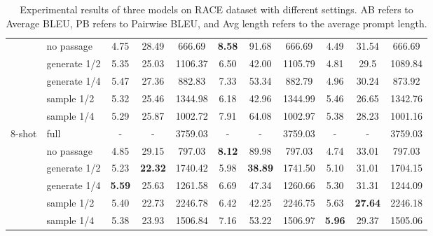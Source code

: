 \begin{table*}[t]
\begin{tabular}{l|l|ccc|ccc|ccc}
 & no passage &4.75 & 28.49 & 666.69 & \textbf{8.58} & 91.68 & 666.69 & 4.49 & 31.54 & 666.69 \\
 & generate 1/2 & 5.35 & 25.03 & 1106.37 & 6.50 & 42.00 & 1105.79 & 4.81 & 29.5 & 1089.84\\
 & generate 1/4 & 5.47 & 27.36 & 882.83 & 7.33 & 53.34 & 882.79 & 4.96 & 30.24 & 873.92\\
 & sample 1/2 & 5.32 & 25.46 & 1344.98 & 6.18 & 42.96 & 1344.99 & 5.46 & 26.65 & 1342.76\\
 & sample 1/4 & 5.29 & 25.87 & 1002.72 & 7.91 & 64.08 & 1002.97 & 5.38 & 28.23 & 1001.16\\
\hline
8-shot & full & - & - & 3759.03 & - & - & 3759.03 & - & - & 3759.03 \\
 & no passage & 4.85 & 29.15 & 797.03 & \textbf{8.12} & 89.98 & 797.03 & 4.74 & 33.01 & 797.03\\
 & generate 1/2 & 5.23 & \textbf{22.32} & 1740.42 & 5.98 & \textbf{38.89} & 1741.50 & 5.10 & 31.01 & 1704.15\\
 & generate 1/4 & \textbf{5.59} & 25.63 & 1261.58 & 6.69 & 47.34 & 1260.66 & 5.30 & 31.31 & 1244.09\\
 & sample 1/2 & 5.40 & 22.73 & 2246.78 & 6.42 & 42.25 & 2246.75 & 5.63 & \textbf{27.64} & 2246.18 \\
 & sample 1/4 & 5.38 & 23.93 & 1506.84 & 7.16 & 53.22 & 1506.97 & \textbf{5.96} & 29.37 & 1505.06\\
\hline
\toprule
\end{tabular}
\caption{Experimental results of three models on RACE dataset with different settings. AB refers to Average BLEU, PB refers to Pairwise BLEU, and Avg length refers to the average prompt length. 
}
\label{tab:dg_main}
\end{table*}